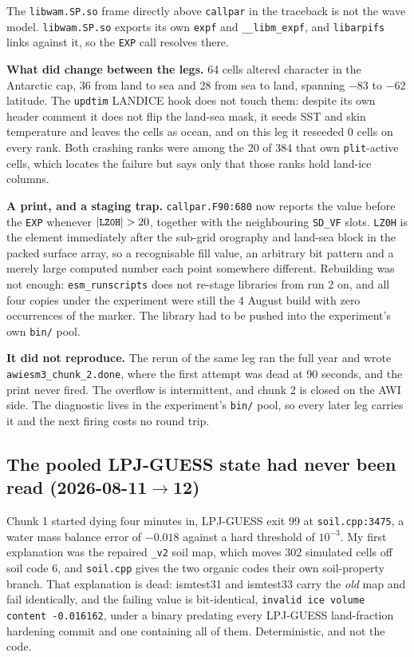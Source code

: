 \documentclass[11pt,a4paper]{article}
\newcommand{\code}[1]{\texttt{\small #1}}
\begin{document}
The \code{libwam.SP.so} frame directly above \code{callpar} in the traceback is not the wave model.
\code{libwam.SP.so} exports its own \code{expf} and \code{\_\_libm\_expf}, and \code{libarpifs}
links against it, so the \code{EXP} call resolves there.

\medskip\noindent
\textbf{What did change between the legs.} 64 cells altered character in the Antarctic cap, 36 from
land to sea and 28 from sea to land, spanning $-83$ to $-62$ latitude. The \code{updtim} LANDICE
hook does not touch them: despite its own header comment it does not flip the land-sea mask, it
seeds SST and skin temperature and leaves the cells as ocean, and on this leg it reseeded 0 cells
on every rank. Both crashing ranks were among the 20 of 384 that own \code{plit}-active cells,
which locates the failure but says only that those ranks hold land-ice columns.

\medskip\noindent
\textbf{A print, and a staging trap.} \code{callpar.F90:680} now reports the value before the
\code{EXP} whenever $|\code{LZ0H}| > 20$, together with the neighbouring \code{SD\_VF} slots.
\code{LZ0H} is the element immediately after the sub-grid orography and land-sea block in the
packed surface array, so a recognisable fill value, an arbitrary bit pattern and a merely large
computed number each point somewhere different. Rebuilding was not enough: \code{esm\_runscripts}
does not re-stage libraries from run 2 on, and all four copies under the experiment were still the
4 August build with zero occurrences of the marker. The library had to be pushed into the
experiment's own \code{bin/} pool.

\medskip\noindent
\textbf{It did not reproduce.} The rerun of the same leg ran the full year and wrote
\code{awiesm3\_chunk\_2.done}, where the first attempt was dead at 90 seconds, and the print never
fired. The overflow is intermittent, and chunk 2 is closed on the AWI side. The diagnostic lives in
the experiment's \code{bin/} pool, so every later leg carries it and the next firing costs no round
trip.


\subsection{The pooled LPJ-GUESS state had never been read (2026-08-11$\to$12)}

Chunk 1 started dying four minutes in, LPJ-GUESS exit 99 at \code{soil.cpp:3475}, a water
mass balance error of $-0.018$ against a hard threshold of $10^{-3}$. My first explanation was
the repaired \code{\_v2} soil map, which moves 302 simulated cells off soil code 6, and
\code{soil.cpp} gives the two organic codes their own soil-property branch. That explanation is
dead: ismtest31 and ismtest33 carry the \emph{old} map and fail identically, and the failing
value is bit-identical, \code{invalid ice volume content -0.016162}, under a binary predating
every LPJ-GUESS land-fraction hardening commit and one containing all of them. Deterministic,
and not the code.
\end{document}
